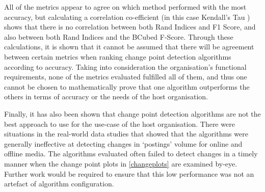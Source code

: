 \documentclass[../main.tex]{subfiles}
\begin{document}
All of the metrics appear to agree on which method performed with the most accuracy, but calculating a correlation co-efficient (in this case Kendall's Tau \cite{KENDALL1938}) shows that there is no correlation between both Rand Indices and F1 Score, and also between both Rand Indices and the BCubed F-Score. Through these calculations, it is shown that it cannot be assumed that there will be agreement between certain metrics when ranking change point detection algorithms according to accuracy. Taking into consideration the organisation's functional requirements, none of the metrics evaluated fulfilled all of them, and thus one cannot be chosen to mathematically prove that one algorithm outperforms the others in terms of accuracy or the needs of the host organisation.

\pagebreak

Finally, it has also been shown that change point detection algorithms are not the best approach to use for the use-case of the host organisation. There were situations in the real-world data studies that showed that the algorithms were generally ineffective at detecting changes in `postings' volume for online and offline media. The algorithms evaluated often failed to detect changes in a timely manner when the change point plots in \autoref{changeplots} are examined by-eye. Further work would be required to ensure that this low performance was not an artefact of algorithm configuration.
\end{document}
